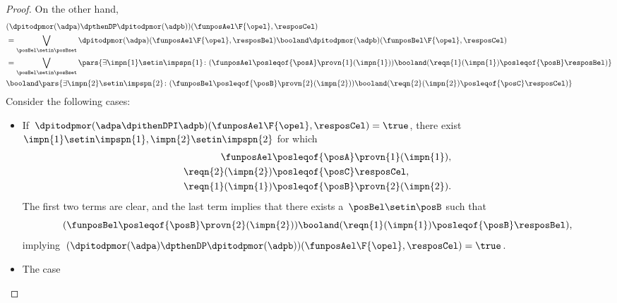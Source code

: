 \begin{proof}
    On the other hand,
    \begin{equation}
        \label{eq:dpitodp_b}
        \begin{aligned}
             & (\dpitodpmor(\adpa) \dpthenDP \dpitodpmor(\adpb))(\funposAel\F{\opel},\resposCel) \\
             & =\bigvee_{\posBel \setin \posBset}\dpitodpmor(\adpa)(\funposAel\F{\opel},\resposBel)\booland \dpitodpmor(\adpb)(\funposBel\F{\opel},\resposCel) \\
             & =\bigvee_{\posBel \setin \posBset} \pars{{\exists \impn{1} \setin \impspn{1}\colon (\funposAel \posleqof{\posA}\provn{1}(\impn{1}))\booland (\reqn{1}(\impn{1})\posleqof{\posB} \resposBel)}} \\
             & \booland \pars{{\exists \impn{2} \setin \impspn{2}\colon (\funposBel \posleqof{\posB}\provn{2}(\impn{2}))\booland (\reqn{2}(\impn{2})\posleqof{\posC} \resposCel)}}
        \end{aligned}
    \end{equation}
    Consider the following cases:
    \begin{itemize}
        \item If~$\dpitodpmor(\adpa \dpithenDPI \adpb)(\funposAel\F{\opel},\resposCel)=\true$, there exist~$\impn{1}\setin \impspn{1},\impn{2}\setin \impspn{2}$ for which
              \begin{equation}
                  \begin{aligned}
                      \funposAel         & \posleqof{\posA}\provn{1}(\impn{1}), \\
                      \reqn{2}(\impn{2}) & \posleqof{\posC} \resposCel, \\
                      \reqn{1}(\impn{1}) & \posleqof{\posB}\provn{2}(\impn{2}).
                  \end{aligned}
              \end{equation}
              The first two terms are clear, and the last term implies that there exists a~$\posBel\setin \posB$ such that
              \begin{equation}
                  (\funposBel\posleqof{\posB}\provn{2}(\impn{2}))
                  \booland (\reqn{1}(\impn{1})\posleqof{\posB}\resposBel),
              \end{equation}
              implying~$(\dpitodpmor(\adpa) \dpthenDP \dpitodpmor(\adpb))(\funposAel\F{\opel},\resposCel)=\true$.
        \item The case
              \begin{equation}

\end{equation}
\end{itemize}
\end{proof}
